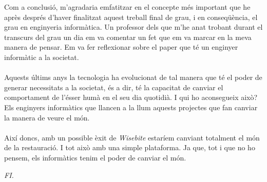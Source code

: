Com a conclusió, m'agradaria emfatitzar en el concepte més important que he après després d'haver finalitzat aquest treball final de grau, i en conseqüència, el grau en enginyeria informàtica. Un professor dels que m'he anat trobant durant el transcurs del grau un dia em va comentar un fet que em va marcar en la meva manera de pensar. Em va fer reflexionar sobre el paper que té un enginyer informàtic a la societat.
\\\\
Aquests últims anys la tecnologia ha evolucionat de tal manera que té el poder de generar necessitats a la societat, és a dir, té la capacitat de canviar el comportament de l'ésser humà en el seu dia quotidià. I qui ho aconsegueix això? Els enginyers informàtics que llancen a la llum aquests projectes que fan canviar la manera de veure el món.
\\\\
Així doncs, amb un possible èxit de \textit{Wisebite} estaríem canviant totalment el món de la restauració. I tot això amb una simple plataforma. Ja que, tot i que no ho pensem, els informàtics tenim el poder de canviar el món.
\\
\begin{center}
\textit{FI.}
\end{center}